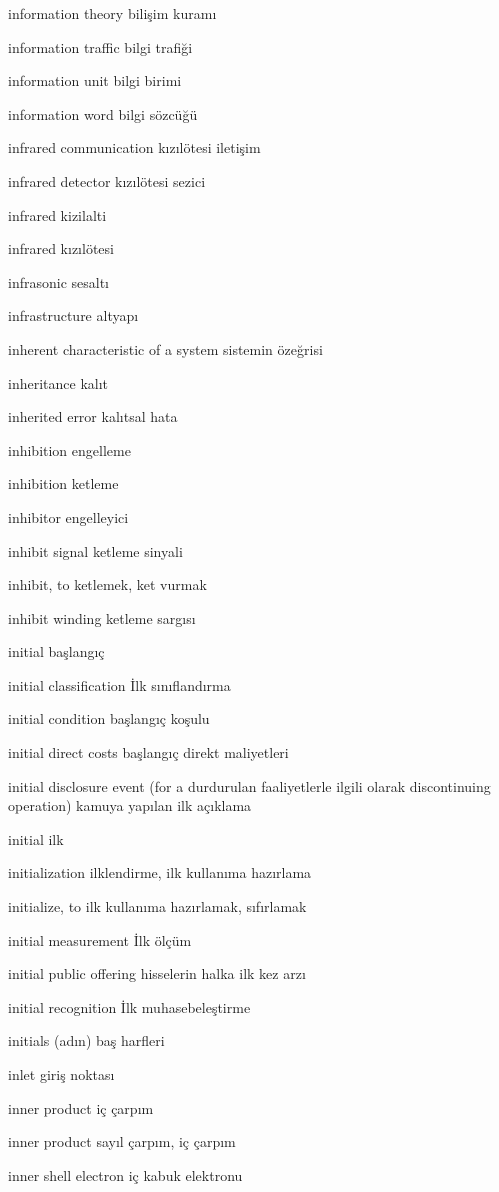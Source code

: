 \documentclass[12pt,fleqn]{article}\usepackage{../../common}
\begin{document}
information theory bilişim kuramı

information traffic bilgi trafiği

information unit bilgi birimi

information word bilgi sözcüğü

infrared communication kızılötesi iletişim

infrared detector kızılötesi sezici

infrared kizilalti

infrared kızılötesi

infrasonic sesaltı

infrastructure altyapı

inherent characteristic of a system sistemin özeğrisi

inheritance kalıt

inherited error kalıtsal hata

inhibition engelleme

inhibition ketleme

inhibitor engelleyici

inhibit signal ketleme sinyali

inhibit, to ketlemek, ket vurmak

inhibit winding ketleme sargısı

initial başlangıç

initial classification İlk sınıflandırma

initial condition başlangıç koşulu

initial direct costs başlangıç direkt maliyetleri

initial disclosure event (for a durdurulan faaliyetlerle ilgili olarak discontinuing operation) kamuya yapılan ilk açıklama

initial ilk

initialization ilklendirme, ilk kullanıma hazırlama

initialize, to ilk kullanıma hazırlamak, sıfırlamak

initial measurement İlk ölçüm

initial public offering hisselerin halka ilk kez arzı

initial recognition İlk muhasebeleştirme

initials (adın) baş harfleri

inlet giriş noktası

inner product iç çarpım

inner product sayıl çarpım, iç çarpım

inner shell electron iç kabuk elektronu
\end{document}
